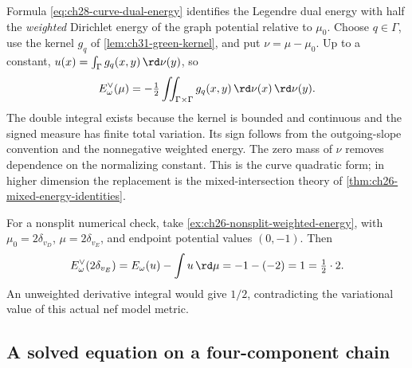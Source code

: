 \begin{remark}
\label{rem:ch28-classical-energy}
Formula \eqref{eq:ch28-curve-dual-energy} identifies the Legendre dual
energy with half the \emph{weighted} Dirichlet energy of the graph
potential relative to \(\mu_0\).  Choose \(q\in\Gamma\), use the
kernel \(g_q\) of \cref{lem:ch31-green-kernel}, and put
\(\nu=\mu-\mu_0\).  Up to a constant,
\(u(x)=\int_\Gamma g_q(x,y)\,\rd\nu(y)\), so
\[
 E^\vee_\omega(\mu)
 =-\tfrac12\iint_{\Gamma\times\Gamma}
          g_q(x,y)\,\rd\nu(x)\,\rd\nu(y).
\]
The double integral exists because the kernel is bounded and continuous
and the signed measure has finite total variation.  Its sign follows
from the outgoing-slope convention and the nonnegative weighted energy.
The zero mass of \(\nu\) removes dependence on the normalizing constant.
This is the curve quadratic form; in higher dimension the replacement is
the mixed-intersection theory of \cref{thm:ch26-mixed-energy-identities}.

For a nonsplit numerical check, take
\cref{ex:ch26-nonsplit-weighted-energy}, with
\(\mu_0=2\delta_{v_D}\), \(\mu=2\delta_{v_E}\), and endpoint
potential values \((0,-1)\).  Then
\[
 E^\vee_\omega(2\delta_{v_E})
 =E_\omega(u)-\int u\,\rd\mu=-1-(-2)=1
 =\tfrac12\cdot2.
\]
An unweighted derivative integral would give \(1/2\), contradicting
the variational value of this actual nef model metric.
\end{remark}

\subsection{A solved equation on a four-component chain}
\label{sec:ch28-chain}

